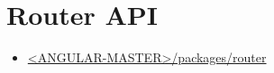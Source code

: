 \section{Router API}



\begin{itemize}
  \item \href{https://github.com/angular/angular/tree/master/packages/router}
        {<ANGULAR-MASTER>/packages/router}
\end{itemize}










